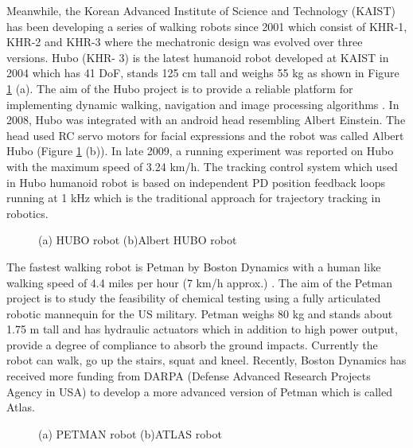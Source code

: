 Meanwhile, the Korean Advanced Institute of Science and Technology (KAIST) has been developing a series of walking robots since 2001 which consist of KHR-1, KHR-2 and KHR-3 where the mechatronic design was evolved over three versions. Hubo (KHR- 3) is the latest humanoid robot developed at KAIST in 2004 which has 41 DoF, stands 125 cm tall and weighs 55 kg as shown in Figure \ref{fig:hubo} (a). The aim of the Hubo project is to provide a reliable platform for implementing dynamic walking, navigation and image processing algorithms \cite{Park2007}. In 2008, Hubo was integrated with an android head resembling Albert Einstein. The head used RC servo motors for facial expressions and the robot was called Albert Hubo \cite{Park2008} (Figure \ref{fig:hubo} (b)). In late 2009, a running experiment was reported on Hubo \cite{Cho2009} with the maximum speed of 3.24 km/h. The tracking control system which used in Hubo humanoid robot is based on independent PD position feedback loops running at 1 kHz which is the traditional approach for trajectory tracking in robotics.

\begin{figure}[!hbt]
\centering 
{}\hspace{10mm}
\caption{(a) HUBO robot (b)Albert HUBO robot}
\label{fig:hubo}
\end{figure}


The fastest walking robot is Petman by Boston Dynamics with a human like walking speed of 4.4 miles per hour (7 km/h approx.) \cite{BostonWeb}. The aim of the Petman project is to study the feasibility of chemical testing using a fully articulated robotic mannequin for the US military. Petman weighs 80 kg and stands about 1.75 m tall and has hydraulic actuators which in addition to high power output, provide a degree of compliance to absorb the ground impacts. Currently the robot can walk, go up the stairs, squat and kneel. Recently, Boston Dynamics has received more funding from DARPA (Defense Advanced Research Projects Agency in USA) to develop a more advanced version of Petman which is called Atlas.

\begin{figure}[!hbt]
\centering 
{}\hspace{10mm}
\caption{(a) PETMAN robot (b)ATLAS robot}
\label{fig:boston}
\end{figure}


